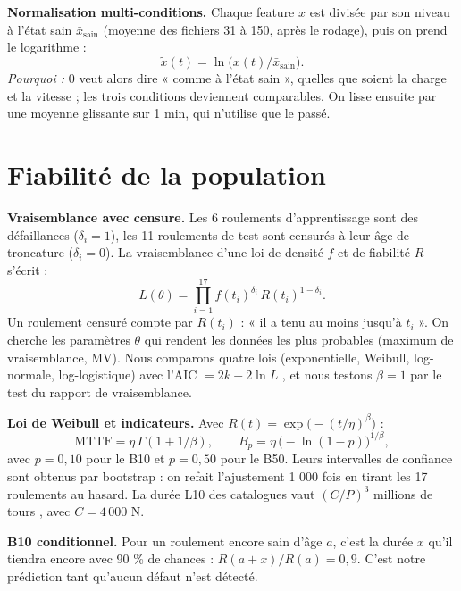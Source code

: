 \textbf{Normalisation multi-conditions.} Chaque feature $x$ est divisée par son niveau à l'état sain $\bar{x}_{\text{sain}}$ (moyenne des fichiers 31 à 150, après le rodage), puis on prend le logarithme :
\begin{equation}
\tilde{x}(t) = \ln\big(x(t) / \bar{x}_{\text{sain}}\big).
\end{equation}
\emph{Pourquoi :} 0 veut alors dire « comme à l'état sain », quelles que soient la charge et la vitesse ; les trois conditions deviennent comparables. On lisse ensuite par une moyenne glissante sur 1 min, qui n'utilise que le passé.

\section{Fiabilité de la population}

\textbf{Vraisemblance avec censure.} Les 6 roulements d'apprentissage sont des défaillances ($\delta_i = 1$), les 11 roulements de test sont censurés à leur âge de troncature ($\delta_i = 0$). La vraisemblance d'une loi de densité $f$ et de fiabilité $R$ s'écrit :
\begin{equation}
L(\theta) = \prod_{i=1}^{17} f(t_i)^{\delta_i}\, R(t_i)^{1-\delta_i}.
\end{equation}
Un roulement censuré compte par $R(t_i)$ : « il a tenu au moins jusqu'à $t_i$ ». On cherche les paramètres $\theta$ qui rendent les données les plus probables (maximum de vraisemblance, MV). Nous comparons quatre lois (exponentielle, Weibull, log-normale, log-logistique) avec l'AIC $= 2k - 2\ln L$ \cite{akaike1974}, et nous testons $\beta = 1$ par le test du rapport de vraisemblance.

\textbf{Loi de Weibull et indicateurs.} Avec $R(t) = \exp\!\big(-(t/\eta)^{\beta}\big)$ \cite{benhmida2022} :
\begin{equation}
\text{MTTF} = \eta\,\Gamma(1 + 1/\beta), \qquad B_p = \eta\,\big(-\ln(1-p)\big)^{1/\beta},
\end{equation}
avec $p = 0{,}10$ pour le B10 et $p = 0{,}50$ pour le B50. Leurs intervalles de confiance sont obtenus par bootstrap \cite{efron1979} : on refait l'ajustement 1 000 fois en tirant les 17 roulements au hasard. La durée L10 des catalogues vaut $(C/P)^3$ millions de tours \cite{iso281}, avec $C = 4\,000$ N.

\textbf{B10 conditionnel.} Pour un roulement encore sain d'âge $a$, c'est la durée $x$ qu'il tiendra encore avec 90 \% de chances : $R(a + x)/R(a) = 0{,}9$. C'est notre prédiction tant qu'aucun défaut n'est détecté.


